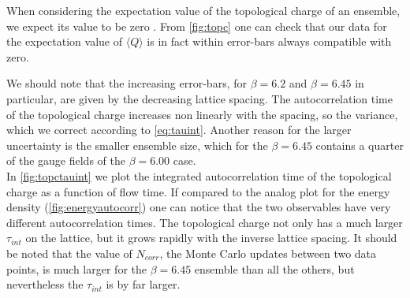 When considering the expectation value of the topological charge of an ensemble, we expect its value to be zero \cite{ce_non-gaussianities_2015}. From \cref{fig:topc} one can check that our data for the expectation value of $\langle Q\rangle$ is in fact within error-bars always compatible with zero. 

We should note that the increasing error-bars, for $\beta = 6.2$ and $\beta = 6.45$ in particular, are given by the decreasing lattice spacing. The autocorrelation time of the topological charge increases non linearly with the spacing, so the variance, which we correct according to \cref{eq:tauint}. Another reason for the larger uncertainty is the smaller ensemble size, which for the $\beta = 6.45$ contains a quarter of the gauge fields of the  $\beta=6.00$  case. \\
In \cref{fig:topctauint} we plot the integrated autocorrelation time of the topological charge as a function of flow time. If compared to the analog plot for the energy density (\cref{fig:energyautocorr}) one can notice that the two observables have very different autocorrelation times. The topological charge not only has a much larger $\tau_{int}$ on the lattice, but it grows rapidly with the inverse lattice spacing. It should be noted that the value of $N_{corr}$, the Monte Carlo updates between two data points, is much larger for the $\beta=6.45$ ensemble than all the others, but nevertheless the $\tau_{int}$ is by far larger.

